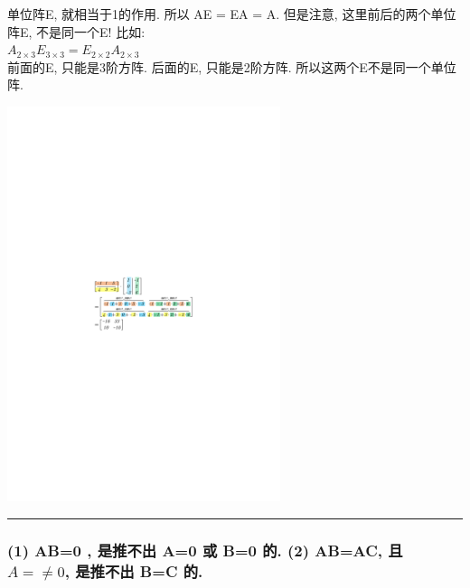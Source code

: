 \documentclass[UTF8]{ctexart}
\begin{document}
单位阵E, 就相当于1的作用. 所以 AE = EA = A. 但是注意, 这里前后的两个单位阵E, 不是同一个E!  比如: \\
$A_{2×3}E_{3×3}=E_{2×2}A_{2×3}$\\
前面的E, 只能是3阶方阵. 后面的E, 只能是2阶方阵. 所以这两个E不是同一个单位阵. \\







\begin{myEnvSample}
\includegraphics[width=0.6\textwidth]{img/0017.pdf}
\end{myEnvSample}

\hrule

\subsubsection{(1) AB=0 , 是推不出 A=0 或 B=0 的. (2) AB=AC, 且 $A =\neq 0 $, 是推不出 B=C 的.}
\end{document}
